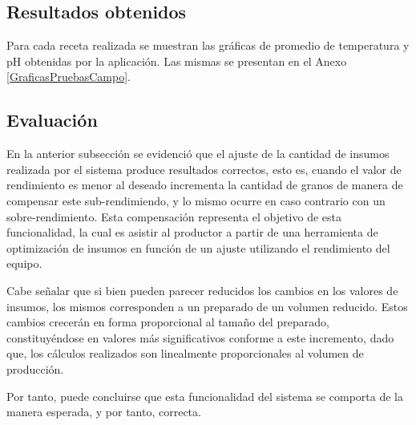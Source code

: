     \subsection{Resultados obtenidos}
        \par Para cada receta realizada se muestran las gráficas de promedio de temperatura y pH obtenidas por la aplicación. Las mismas se presentan en el Anexo \ref{GraficasPruebasCampo}.
    
    \subsection{Evaluación}
        \par En la anterior subsección se evidenció que el ajuste de la cantidad de insumos realizada por el sistema produce resultados correctos, esto es, cuando el valor de rendimiento es menor al deseado incrementa la cantidad de granos de manera de compensar este sub-rendimiendo, y lo mismo ocurre en caso contrario con un sobre-rendimiento. Esta compensación representa el objetivo de esta funcionalidad, la cual es asistir al productor a partir de una herramienta de optimización de insumos en función de un ajuste utilizando el rendimiento del equipo.
        
        \par Cabe señalar que si bien pueden parecer reducidos los cambios en los valores de insumos, los mismos corresponden a un preparado de un volumen reducido. Estos cambios crecerán en forma proporcional al tamaño del preparado, constituyéndose en valores más significativos conforme a este incremento, dado que, los cálculos realizados son linealmente proporcionales al volumen de producción.
        
        \par Por tanto, puede concluirse que esta funcionalidad del sistema se comporta de la manera esperada, y por tanto, correcta. 